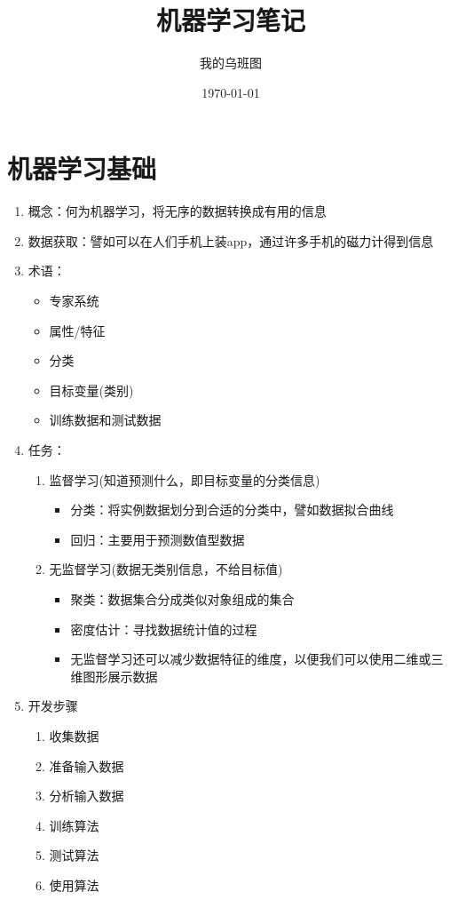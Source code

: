 \documentclass[11pt]{ctexart}
\author{我的乌班图}
\date{\today}
\title{机器学习笔记}
\begin{document}
\maketitle
\tableofcontents


\section{机器学习基础}
\label{sec:orgheadline1}
\begin{enumerate}
\item 概念：何为机器学习，将无序的数据转换成有用的信息
\item 数据获取：譬如可以在人们手机上装app，通过许多手机的磁力计得到信息
\item 术语：
\begin{itemize}
\item 专家系统
\item 属性/特征
\item 分类
\item 目标变量(类别)
\item 训练数据和测试数据
\end{itemize}
\item 任务：
\begin{enumerate}
\item 监督学习(知道预测什么，即目标变量的分类信息)
\begin{itemize}
\item 分类：将实例数据划分到合适的分类中，譬如数据拟合曲线
\item 回归：主要用于预测数值型数据
\end{itemize}
\item 无监督学习(数据无类别信息，不给目标值)
\begin{itemize}
\item 聚类：数据集合分成类似对象组成的集合
\item 密度估计：寻找数据统计值的过程
\item 无监督学习还可以减少数据特征的维度，以便我们可以使用二维或三维图形展示数据
\end{itemize}
\end{enumerate}
\item 开发步骤
\begin{enumerate}
\item 收集数据
\item 准备输入数据
\item 分析输入数据
\item 训练算法
\item 测试算法
\item 使用算法
\end{enumerate}
\end{enumerate}
\end{document}
